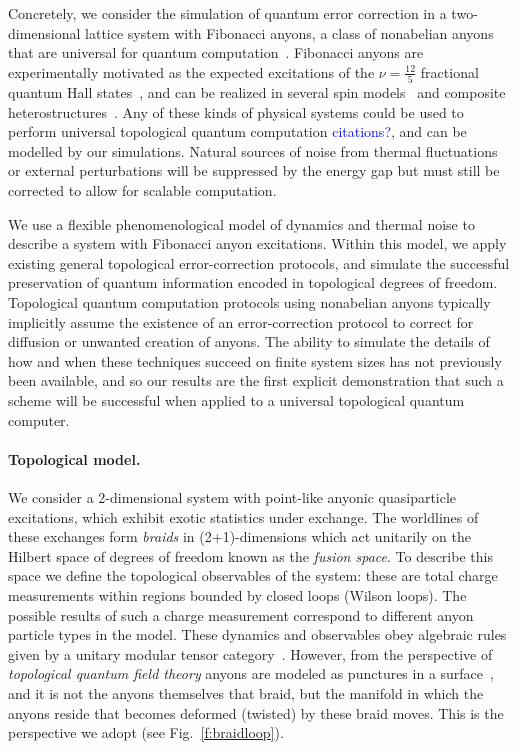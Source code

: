 \documentclass[aps, prl, letterpaper, twocolumn, superscriptaddress, notitlepage, 10pt]{revtex4-1}
\newcommand{\Fref}[1]{Fig.~\ref{#1}}
\newcommand{\cggb}[1]{\textcolor{blue}{#1}}
\begin{document}
Concretely, we consider the simulation of quantum error correction in a two-dimensional lattice 
system with Fibonacci anyons, a class of nonabelian anyons that are universal for quantum 
computation~\cite{Freedman2002, Nayak2008}. Fibonacci anyons are experimentally motivated as the 
expected excitations of the $\nu=\frac{12}{5}$ fractional quantum Hall 
states~\cite{Slingerland2001}, and can be realized in several spin 
models~\cite{Levin2005, Bonesteel2012, Kapit2013, Palumbo2014} and composite 
heterostructures~\cite{Mong2014}.
Any of these kinds of physical systems could be used to perform universal topological quantum computation \cggb{citations?}, and can be modelled by our simulations. Natural sources of noise from thermal fluctuations or external perturbations will be suppressed by the energy gap but must still be corrected to allow for scalable computation.

We use a flexible phenomenological model of dynamics and thermal 
noise to describe a system with Fibonacci anyon excitations. Within 
this model, we apply existing general topological error-correction protocols, and 
simulate the successful preservation of quantum information encoded in topological 
degrees of freedom. Topological quantum computation protocols using nonabelian anyons 
typically implicitly assume the existence of an error-correction protocol to 
correct for diffusion or unwanted creation of anyons. 
The ability to simulate the details of how and when these techniques succeed on finite system sizes has not previously been available, and so our results are the first explicit demonstration that such a scheme will be successful when applied to a universal topological quantum computer.


\paragraph{Topological model.}

We consider a 
2-dimensional system with
point-like anyonic quasiparticle excitations, which exhibit exotic statistics under exchange.
The worldlines of these exchanges form \emph{braids}
in (2+1)-dimensions
which act unitarily on the Hilbert space of degrees of freedom known as the \emph{fusion space}.
To describe this space we define
the topological observables of the system: these
are total charge measurements within regions bounded by 
closed loops (Wilson loops).
The possible results of such a charge measurement correspond to different anyon particle types in the model.
These dynamics and observables obey algebraic rules
given by a unitary modular tensor category~\cite{Wang2010b}. 
However, from the perspective of
\emph{topological quantum field theory}
anyons are modeled
as punctures in a surface~\cite{Pfeifer2014}, and it is not
the anyons themselves that braid,
but the manifold in which the anyons reside 
that becomes deformed (twisted) by these braid moves.
This is the perspective we adopt (see \Fref{f:braidloop}).
\end{document}
